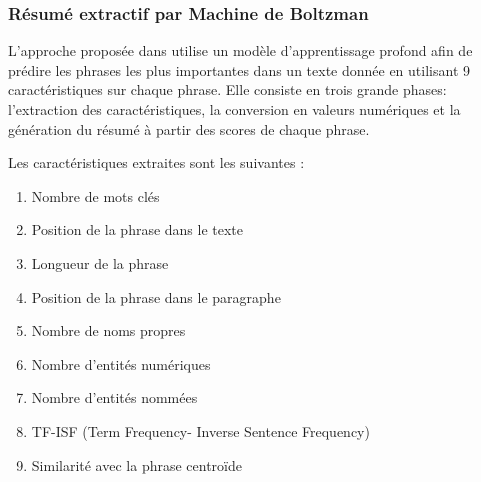         \subsubsection{Résumé extractif par Machine de Boltzman}
            L'approche proposée dans \cite{boltzman} utilise un modèle d'apprentissage profond afin de prédire les phrases les plus importantes dans un texte donnée en utilisant 9 caractéristiques sur chaque phrase. Elle consiste en trois grande phases: l'extraction des caractéristiques, la conversion en valeurs numériques et la génération du résumé à partir des scores de chaque phrase. 

            Les caractéristiques extraites sont les suivantes :
            \begin{enumerate}
                \item{Nombre de mots clés}
                \item{Position de la phrase dans le texte}
                \item{Longueur de la phrase}
                \item{Position de la phrase dans le paragraphe}
                \item{Nombre de noms propres}
                \item{Nombre d'entités numériques}
                \item{Nombre d'entités nommées}
                \item{TF-ISF (Term Frequency- Inverse Sentence Frequency)}
                \item{Similarité avec la phrase centroïde}
            \end{enumerate}    

